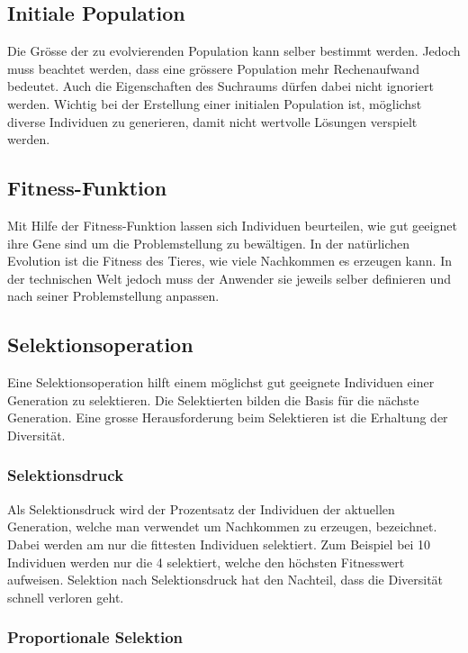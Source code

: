     \subsection{Initiale Population}
      Die Grösse der zu evolvierenden Population kann selber bestimmt werden.
      Jedoch muss beachtet werden, dass eine grössere Population mehr Rechenaufwand bedeutet.
      Auch die Eigenschaften des Suchraums dürfen dabei nicht ignoriert werden.
      Wichtig bei der Erstellung einer initialen Population ist, möglichst diverse Individuen zu generieren,
      damit nicht wertvolle Lösungen verspielt werden.

    \subsection{Fitness-Funktion}

      Mit Hilfe der Fitness-Funktion lassen sich Individuen beurteilen,
      wie gut geeignet ihre Gene sind um die Problemstellung zu bewältigen.
      In der natürlichen Evolution ist die Fitness des Tieres, wie viele Nachkommen es erzeugen kann.
      In der technischen Welt jedoch muss der Anwender sie jeweils selber definieren und
      nach seiner Problemstellung anpassen.
    \subsection{Selektionsoperation}

      Eine Selektionsoperation hilft einem möglichst gut geeignete Individuen einer Generation zu selektieren.
      Die Selektierten bilden die Basis für die nächste Generation.
      Eine grosse Herausforderung beim Selektieren ist die Erhaltung der Diversität.

      \subsubsection{Selektionsdruck}

        Als Selektionsdruck wird der Prozentsatz der Individuen der aktuellen Generation,
        welche man verwendet um Nachkommen zu erzeugen, bezeichnet.
        Dabei werden am nur die fittesten Individuen selektiert.
        Zum Beispiel bei 10 Individuen werden nur die 4 selektiert, welche den höchsten Fitnesswert aufweisen.
        Selektion nach Selektionsdruck hat den Nachteil, dass die Diversität schnell verloren geht.

      \subsubsection{Proportionale Selektion}


